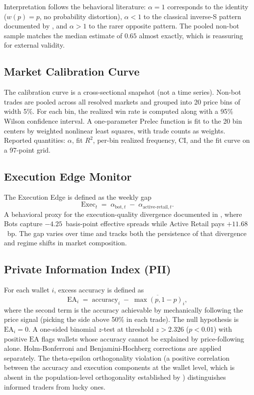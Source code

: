\documentclass[11pt,letterpaper]{article}
\begin{document}
Interpretation follows the behavioral literature: $\alpha = 1$ corresponds to the identity ($w(p) = p$, no probability distortion), $\alpha < 1$ to the classical inverse-S pattern documented by \citet{tverskykahneman1992}, and $\alpha > 1$ to the rarer opposite pattern. The pooled non-bot sample matches the \citet{tverskykahneman1992} median estimate of $0.65$ almost exactly, which is reassuring for external validity.

\subsection{Market Calibration Curve}
\label{sub:calibration}

The calibration curve is a cross-sectional snapshot (not a time series). Non-bot trades are pooled across all resolved markets and grouped into 20 price bins of width 5\%. For each bin, the realized win rate is computed along with a 95\% Wilson confidence interval. A one-parameter Prelec function is fit to the 20 bin centers by weighted nonlinear least squares, with trade counts as weights. Reported quantities: $\alpha$, fit $R^2$, per-bin realized frequency, CI, and the fit curve on a 97-point grid.

\subsection{Execution Edge Monitor}
\label{sub:execution}

The Execution Edge is defined as the weekly gap
\[
  \mathrm{Exec}_t \;=\; \alpha_{\mathrm{bot}, t} \;-\; \alpha_{\mathrm{active\text{-}retail}, t}.
\]
A behavioral proxy for the execution-quality divergence documented in \citet{dellavedova2026profits}, where Bots capture $-4.25$~basis-point effective spreads while Active Retail pays $+11.68$~bp. The gap varies over time and tracks both the persistence of that divergence and regime shifts in market composition.

\subsection{Private Information Index (PII)}
\label{sub:pii}

For each wallet $i$, excess accuracy is defined as
\[
  \mathrm{EA}_i \;=\; \mathrm{accuracy}_i \;-\; \overline{\max(p, 1-p)}_i,
\]
where the second term is the accuracy achievable by mechanically following the price signal (picking the side above 50\% in each trade). The null hypothesis is $\mathrm{EA}_i = 0$. A one-sided binomial $z$-test at threshold $z > 2.326$ ($p < 0.01$) with positive $\mathrm{EA}$ flags wallets whose accuracy cannot be explained by price-following alone. Holm-Bonferroni and Benjamini-Hochberg corrections are applied separately. The theta-epsilon orthogonality violation (a positive correlation between the accuracy and execution components at the wallet level, which is absent in the population-level orthogonality established by \citet{dellavedova2026profits}) distinguishes informed traders from lucky ones.
\end{document}
